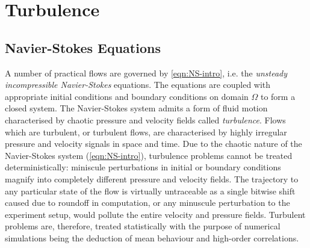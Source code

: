 \chapter{Turbulence}
\label{chap:turb}

\section{Navier-Stokes Equations}
A number of practical flows are governed by \autoref{eqn:NS-intro}, i.e. the \textit{unsteady incompressible Navier-Stokes} equations. The equations are coupled with appropriate initial conditions and boundary conditions on domain $\Omega$ to form a closed system. The Navier-Stokes system admits a form of fluid motion characterised by chaotic pressure and velocity fields called \textit{turbulence}. Flows which are turbulent, or turbulent flows, are characterised by highly irregular pressure and velocity signals in space and time. Due to the chaotic nature of the Navier-Stokes system (\autoref{eqn:NS-intro}), turbulence problems cannot be treated deterministically: miniscule perturbations in initial or boundary conditions magnify into completely different pressure and velocity fields. The trajectory to any particular state of the flow is virtually untraceable as a single bitwise shift caused due to roundoff in computation, or any minuscule perturbation to the experiment setup, would pollute the entire velocity and pressure fields. Turbulent problems are, therefore, treated statistically with the purpose of numerical simulations being the deduction of mean behaviour and high-order correlations.

